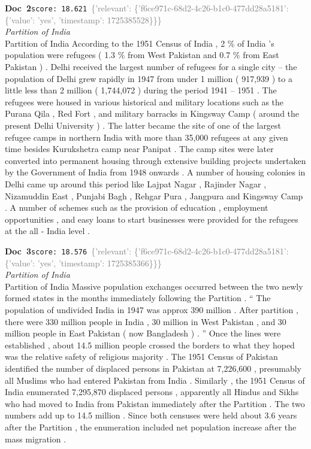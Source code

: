 \documentclass[a4paper,11pt]{article}
\begin{document}
\begin{docenv}
{\footnotesize\textcolor{doccolor}{\textbf{Doc~2}}}\hfill{\tiny\texttt{score:~18.621}}\ {\tiny\textcolor{gray}{\{'relevant': \{'f6ce971c-68d2-4c26-b1c0-477dd28a5181': \{'value': 'yes', 'timestamp': 1725385528\}\}\}}}\\[3pt]
{\small\textit{Partition of India}}\\[2pt]
\vspace{2pt}
{\footnotesize Partition of India
According to the 1951 Census of India , 2 \% of India 's population were refugees ( 1.3 \% from West Pakistan and 0.7 \% from East Pakistan ) . Delhi received the largest number of refugees for a single city -- the population of Delhi grew rapidly in 1947 from under 1 million ( 917,939 ) to a little less than 2 million ( 1,744,072 ) during the period 1941 -- 1951 . The refugees were housed in various historical and military locations such as the Purana Qila , Red Fort , and military barracks in Kingsway Camp ( around the present Delhi University ) . The latter became the site of one of the largest refugee camps in northern India with more than 35,000 refugees at any given time besides Kurukshetra camp near Panipat . The camp sites were later converted into permanent housing through extensive building projects undertaken by the Government of India from 1948 onwards . A number of housing colonies in Delhi came up around this period like Lajpat Nagar , Rajinder Nagar , Nizamuddin East , Punjabi Bagh , Rehgar Pura , Jangpura and Kingsway Camp . A number of schemes such as the provision of education , employment opportunities , and easy loans to start businesses were provided for the refugees at the all - India level .}
\end{docenv}
\begin{docenv}
{\footnotesize\textcolor{doccolor}{\textbf{Doc~3}}}\hfill{\tiny\texttt{score:~18.576}}\ {\tiny\textcolor{gray}{\{'relevant': \{'f6ce971c-68d2-4c26-b1c0-477dd28a5181': \{'value': 'yes', 'timestamp': 1725385366\}\}\}}}\\[3pt]
{\small\textit{Partition of India}}\\[2pt]
\vspace{2pt}
{\footnotesize Partition of India
Massive population exchanges occurred between the two newly formed states in the months immediately following the Partition . `` The population of undivided India in 1947 was approx 390 million . After partition , there were 330 million people in India , 30 million in West Pakistan , and 30 million people in East Pakistan ( now Bangladesh ) . '' Once the lines were established , about 14.5 million people crossed the borders to what they hoped was the relative safety of religious majority . The 1951 Census of Pakistan identified the number of displaced persons in Pakistan at 7,226,600 , presumably all Muslims who had entered Pakistan from India . Similarly , the 1951 Census of India enumerated 7,295,870 displaced persons , apparently all Hindus and Sikhs who had moved to India from Pakistan immediately after the Partition . The two numbers add up to 14.5 million . Since both censuses were held about 3.6 years after the Partition , the enumeration included net population increase after the mass migration .}
\end{docenv}
\end{document}
